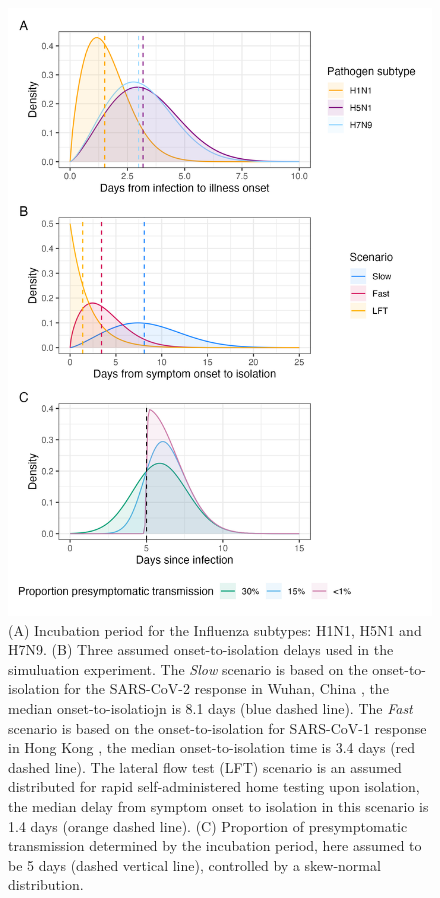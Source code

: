 \documentclass{article}
\begin{document}
\begin{figure}[ht]
\centering
\includegraphics[width=\textwidth,height=0.85\textheight]{../plots/delay_distributions.png}
\caption{(A) Incubation period for the Influenza subtypes: H1N1, H5N1 and H7N9. (B) Three assumed onset-to-isolation delays used in the simuluation experiment. The \textit{Slow} scenario is based on the onset-to-isolation for the SARS-CoV-2 response in Wuhan, China \citep{liEarlyTransmissionDynamics2020}, the median onset-to-isolatiojn is 8.1 days (blue dashed line). The \textit{Fast} scenario is based on the onset-to-isolation for SARS-CoV-1 response in Hong Kong \citep{donnellyEpidemiologicalDeterminantsSpread2003a}, the median onset-to-isolation time is 3.4 days (red dashed line). The lateral flow test (LFT) scenario is an assumed distributed for rapid self-administered home testing upon isolation, the median delay from symptom onset to isolation in this scenario is 1.4 days (orange dashed line). (C) Proportion of presymptomatic transmission determined by the incubation period, here assumed to be 5 days (dashed vertical line), controlled by a skew-normal distribution.}
\label{fig:delay-distributions}
\end{figure}
\end{document}
